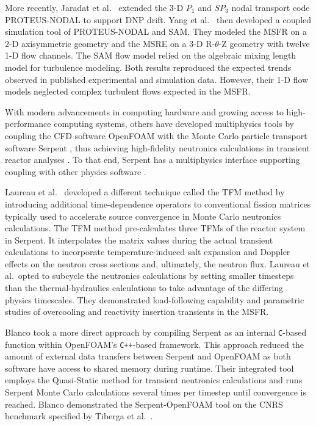 More recently, Jaradat et al.\ \cite{jaradat_development_2021}
extended the 3-D $P_1$ and $SP_3$ nodal transport code PROTEUS-NODAL to support \gls{DNP} drift.
Yang et al.\ \cite{yang_development_2022} then developed a coupled simulation tool of PROTEUS-NODAL
and \gls{SAM}. They modeled the \gls{MSFR} on a 2-D axisymmetric geometry
and the \gls{MSRE} on a 3-D R-$\theta$-Z geometry with twelve 1-D flow channels. The \gls{SAM} flow
model relied on the algebraic mixing length model for turbulence modeling. Both results
reproduced the expected trends observed in published experimental and simulation data. However,
their 1-D flow models neglected complex turbulent flows expected in the \gls{MSFR}.

With modern advancements in computing hardware and growing access to
high-performance computing systems, others have developed multiphysics tools by
coupling the \gls{CFD} software OpenFOAM
\cite{the_openfoam_foundation_ltd_openfoam_2021} with the Monte Carlo particle
transport software Serpent \cite{leppanen_serpent_2014}, thus achieving
high-fidelity neutronics calculations in transient reactor analyses \cite{laureau_transient_2017,
blanco_neutronic_2020}. To that end, Serpent has a multiphysics interface supporting coupling
with other physics software \cite{leppanen_development_2013}.

Laureau et al.\
\cite{laureau_transient_2017} developed a different technique called the
\gls{TFM} method by introducing additional time-dependence
operators to conventional fission matrices typically used to accelerate source
convergence in Monte Carlo neutronics calculations. The \gls{TFM} method
pre-calculates three \glspl{TFM} of the reactor system in Serpent. It
interpolates the matrix values during the actual transient calculations to
incorporate temperature-induced salt expansion and Doppler effects on the neutron cross sections
and, ultimately, the neutron flux. Laureau et al.\ opted to subcycle the neutronics calculations by
setting smaller timesteps than the thermal-hydraulics calculations
to take advantage of the differing physics timescales. They demonstrated load-following capability
and parametric studies of overcooling and reactivity insertion transients in the \gls{MSFR}.

Blanco \cite{blanco_neutronic_2020} took a more direct approach by
compiling Serpent as an internal \texttt{C}-based function within OpenFOAM's
\texttt{C++}-based framework. This approach reduced the amount of external data
transfers between Serpent and OpenFOAM as both software have access to shared
memory during runtime. Their integrated tool employs the Quasi-Static
method for transient neutronics calculations and runs Serpent Monte Carlo
calculations several times per timestep until convergence is reached.
Blanco demonstrated the Serpent-OpenFOAM tool on the CNRS benchmark specified by Tiberga et al.\
\cite{tiberga_results_2020}.

